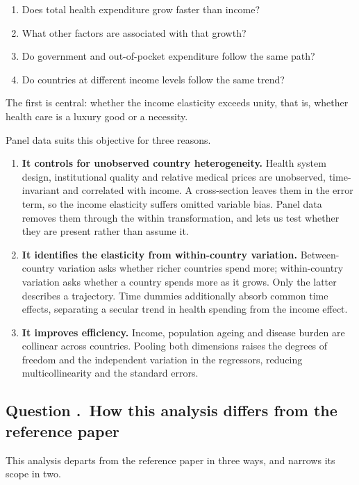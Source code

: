 \documentclass[11pt,a4paper]{article}
\newcounter{qnum}
\newcommand{\question}[1]{\subsection*{Question \stepcounter{qnum}\theqnum.\ #1}}
\begin{document}
\begin{enumerate}
  \item Does total health expenditure grow faster than income?
  \item What other factors are associated with that growth?
  \item Do government and out-of-pocket expenditure follow the same path?
  \item Do countries at different income levels follow the same trend?
\end{enumerate}

The first is central: whether the income elasticity exceeds unity, that is,
whether health care is a luxury good or a necessity.

Panel data suits this objective for three reasons.

\begin{enumerate}
  \item \textbf{It controls for unobserved country heterogeneity.} Health
        system design, institutional quality and relative medical prices are
        unobserved, time-invariant and correlated with income. A cross-section
        leaves them in the error term, so the income elasticity suffers omitted
        variable bias. Panel data removes them through the within
        transformation, and lets us test whether they are present rather than
        assume it.

  \item \textbf{It identifies the elasticity from within-country variation.}
        Between-country variation asks whether richer countries spend more;
        within-country variation asks whether a country spends more as it grows.
        Only the latter describes a trajectory. Time dummies additionally absorb
        common time effects, separating a secular trend in health spending from
        the income effect.

  \item \textbf{It improves efficiency.} Income, population ageing and disease
        burden are collinear across countries. Pooling both dimensions raises the
        degrees of freedom and the independent variation in the regressors,
        reducing multicollinearity and the standard errors.
\end{enumerate}

\question{How this analysis differs from the reference paper}

This analysis departs from the reference paper in three ways, and narrows its
scope in two.
\end{document}

